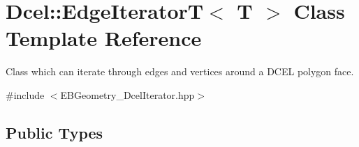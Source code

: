 \hypertarget{classDcel_1_1EdgeIteratorT}{}\section{Dcel\+:\+:Edge\+IteratorT$<$ T $>$ Class Template Reference}
\label{classDcel_1_1EdgeIteratorT}


Class which can iterate through edges and vertices around a D\+C\+EL polygon face.  




{\ttfamily \#include $<$E\+B\+Geometry\+\_\+\+Dcel\+Iterator.\+hpp$>$}

\subsection*{Public Types}
